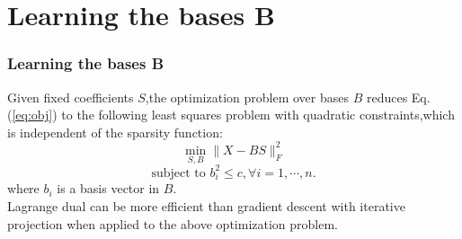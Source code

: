 \documentclass{beamer}
\begin{document}
%

\section{Learning the bases B}
\begin{frame}\frametitle{Learning the bases B}
Given fixed coefficients $S$,the optimization problem over bases $B$ reduces Eq.(\ref{eq:obj}) to the following least squares problem with quadratic constraints,which is independent of the sparsity function:
\begin{equation}\label{eq:learnbases}
\min_{S,B}\|X-BS\|_F^2
\end{equation}
\[\text{subject to }b_i^2\leq c,\forall i=1,\cdots,n.\]
where $b_i$ is a basis vector in $B$.\\
Lagrange dual can be more efficient than gradient descent with iterative projection when applied to the above optimization problem.
\end{frame}
\end{document}
